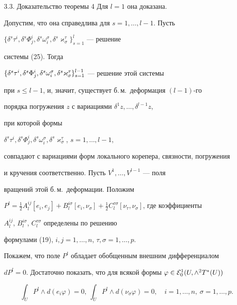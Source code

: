 \begin{pf*}{3.3. Доказательство теоремы 4} Для $l=1$ она доказана.


Допустим, что она справедлива для $s=1,\dotsc,l-1$. Пусть


$\{\delta^s\tau^i,\delta^s\Phi^i_j,\delta^s\omega^{\sigma}_i,


\delta^s\varkappa^{\tau}_{\sigma}\}_{s=1}^l$ --- решение


системы (25). Тогда


$\{\delta^s\tau^i,\delta^s\Phi^i_j,\linebreak


\delta^s\omega^{\sigma}_i,


\delta^s\varkappa^{\tau}_{\sigma}\}_{s=1}^{l-1}$ ---  решение этой системы


при $s\le l-1$, и, значит, существует б.\,м.~деформация $(l-1)$-го


порядка погружения $z$ с вариациями $\delta^1z,\dotsc,\delta^{l-1}z$,


при которой формы


$\delta^s\tau^i,\delta^s\Phi^i_j,\delta^s\omega^{\sigma}_i,


\delta^s\varkappa^{\tau}_{\sigma}$, $s=1,\dotsc,l-1$,


совпадают с вариациями форм локального корепера, связности, погружения


и кручения соответственно. Пусть $V^1,\dotsc,V^{l-1}$ --- поля


вращений этой б.\,м.~деформации. Положим


$P^l=\frac{1}{2}A^{ij}_l[e_i,e_j]+B^{i\sigma}_l[e_i,\nu_{\sigma}]+


\frac{1}{2}C^{\tau\sigma}_l[\nu_{\tau},\nu_{\sigma}]$, где коэффициенты


$A^{ij}_l$, $B^{i\sigma}_l$, $C^{\tau\sigma}_l$ определены по решению


формулами (19), $i,j=1,\dotsc,n$, $\tau,\sigma=1,\dotsc,p$.


Покажем, что поле $P^l$ обладает обобщенным внешним дифференциалом


$dP^l=0$. Достаточно показать, что для всякой формы $\varphi\in{\cal


E}^1_0(U,\wedge^2T^*(U))$


\begin{equation}


\int_{U}P^l\wedge d(e_i\varphi)=0,~\int_{U}P^l\wedge


d(\nu_{\sigma}\varphi)=0,\quad i=1,\dotsc,n, \ \sigma=1,\dotsc,p.



\end{equation}
\end{pf*}
